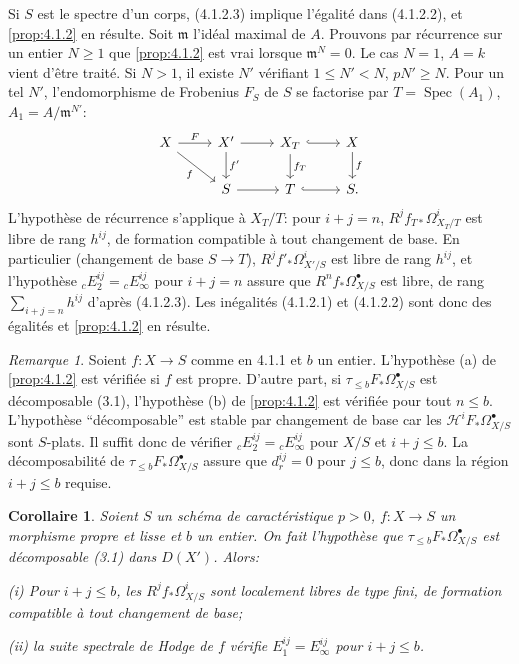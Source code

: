 \documentclass[12pt,a4paper]{article}
\theoremstyle{plain}
\newtheorem{corollary}[theorem]{Corollaire}
\theoremstyle{definition}
\theoremstyle{remark}
\newtheorem{remark}[theorem]{Remarque}
\DeclareMathOperator{\Spec}{Spec}
\begin{document}
Si $S$ est le spectre d'un corps, (4.1.2.3) implique l'\'egalit\'e dans (4.1.2.2), et \ref{prop:4.1.2} en r\'esulte. Soit $\mathfrak{m}$ l'id\'eal maximal de $A$. Prouvons par r\'ecurrence sur un entier $N \ge 1$ que \ref{prop:4.1.2} est vrai lorsque $\mathfrak{m}^N = 0$. Le cas $N = 1$, $A = k$ vient d'\^etre trait\'e. Si $N > 1$, il existe $N'$ v\'erifiant $1 \le N' < N$, $pN' \ge N$. Pour un tel $N'$, l'endomorphisme de Frobenius $F_S$ de $S$ se factorise par $T = \Spec(A_1)$, $A_1 = A/\mathfrak{m}^{N'}$:
\[
\begin{tikzcd}
X \arrow[r, "F"] \arrow[rd, "f"'] & X' \arrow[r] \arrow[d, "f'"] & X_T \arrow[d, "f_T"] \arrow[r, hook] & X \arrow[d, "f"] \\
& S \arrow[r] & T \arrow[r, hook] & S.
\end{tikzcd}
\]
L'hypoth\`ese de r\'ecurrence s'applique \`a $X_T/T$: pour $i + j = n$, $R^j f_{T*} \Omega^i_{X_T/T}$ est libre de rang $h^{ij}$, de formation compatible \`a tout changement de base. En particulier (changement de base $S \to T$), $R^j f'_* \Omega^i_{X'/S}$ est libre de rang $h^{ij}$, et l'hypoth\`ese ${}_c E_2^{ij} = {}_c E_\infty^{ij}$ pour $i + j = n$ assure que $R^n f_* \Omega^{\bullet}_{X/S}$ est libre, de rang $\sum_{i+j=n} h^{ij}$ d'apr\`es (4.1.2.3). Les in\'egalit\'es (4.1.2.1) et (4.1.2.2) sont donc des \'egalit\'es et \ref{prop:4.1.2} en r\'esulte.

\begin{remark}\label{rem:4.1.3}
Soient $f: X \to S$ comme en 4.1.1 et $b$ un entier. L'hypoth\`ese (a) de \ref{prop:4.1.2} est v\'erifi\'ee si $f$ est propre. D'autre part, si $\tau_{\le b} F_* \Omega^{\bullet}_{X/S}$ est d\'ecomposable (3.1), l'hypoth\`ese (b) de \ref{prop:4.1.2} est v\'erifi\'ee pour tout $n \le b$. L'hypoth\`ese ``d\'ecomposable'' est stable par changement de base car les $\mathscr{H}^i F_* \Omega^{\bullet}_{X/S}$ sont $S$-plats. Il suffit donc de v\'erifier ${}_c E_2^{ij} = {}_c E_\infty^{ij}$ pour $X/S$ et $i + j \le b$. La d\'ecomposabilit\'e de $\tau_{\le b} F_* \Omega^{\bullet}_{X/S}$ assure que $d_r^{ij} = 0$ pour $j \le b$, donc dans la r\'egion $i + j \le b$ requise.
\end{remark}

\begin{corollary}\label{cor:4.1.4}
Soient $S$ un sch\'ema de caract\'eristique $p > 0$, $f: X \to S$ un morphisme propre et lisse et $b$ un entier. On fait l'hypoth\`ese que $\tau_{\le b} F_* \Omega^{\bullet}_{X/S}$ est d\'ecomposable \textup{(3.1)} dans $D(X')$. Alors:

\textup{(i)} Pour $i + j \le b$, les $R^j f_* \Omega^i_{X/S}$ sont localement libres de type fini, de formation compatible \`a tout changement de base;

\textup{(ii)} la suite spectrale de Hodge de $f$ v\'erifie $E_1^{ij} = E_\infty^{ij}$ pour $i + j \le b$.
\end{corollary}
\end{document}
